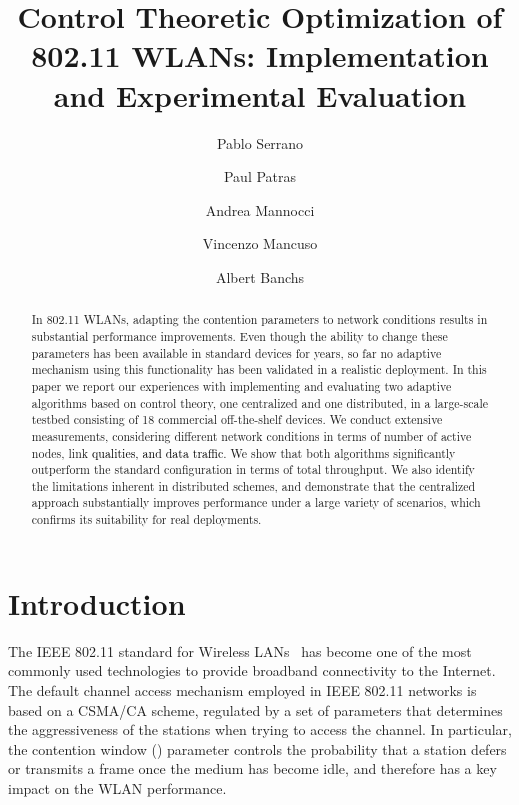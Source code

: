 \documentclass[a4paper,10pt]{article}
\newcommand{\revs}[1]{\textcolor{black}{#1}}
\begin{document}
\title{Control Theoretic Optimization of 802.11 WLANs: Implementation and Experimental Evaluation}

\author[1]{Pablo Serrano}
\author[2]{Paul Patras}
\author[3,1]{Andrea Mannocci}
\author[3,1]{Vincenzo Mancuso}
\author[1,3]{Albert Banchs}


\date{}

\maketitle

\begin{abstract}
In 802.11 WLANs, adapting the contention parameters to network conditions results in substantial performance improvements. Even though the ability to change these parameters has been available in standard devices for years, so far no adaptive mechanism using this functionality has been validated in a realistic deployment. In this paper we report our experiences with implementing and evaluating two adaptive algorithms based on control theory, one centralized and one distributed, in a large-scale testbed consisting of 18 commercial off-the-shelf devices. We conduct extensive measurements, considering different network conditions in terms of number of active nodes, link \revs{qualities, and data traffic}. We show that both algorithms significantly outperform the standard configuration in terms of total throughput. We also identify the limitations inherent in distributed schemes, and demonstrate that the centralized approach substantially improves performance under a large variety of scenarios, which confirms its suitability for real deployments.
\end{abstract}


\section{Introduction}
The IEEE 802.11 standard for Wireless LANs~\cite{80211revised} has become one of the most commonly used technologies to provide broadband connectivity to the Internet. The default channel access mechanism employed in IEEE 802.11 networks is based on a CSMA/CA scheme, regulated by a set of parameters that determines the aggressiveness of the stations when trying to access the channel. In particular, the contention window () parameter controls the probability that a station defers or transmits a frame once the medium has become idle, and therefore has a key impact on the WLAN performance. 
\end{document}
